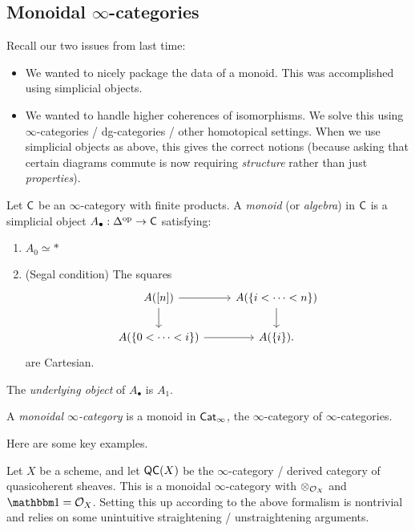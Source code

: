 \documentclass{article}
\begin{document}
\subsection{Monoidal $\infty$-categories}

Recall our two issues from last time:
\begin{itemize}
	\item We wanted to nicely package the data of a monoid.
		This was accomplished using simplicial objects.
	\item We wanted to handle higher coherences of isomorphisms.
		We solve this using $\infty$-categories / dg-categories / other homotopical settings.
		When we use simplicial objects as above, this gives the correct notions (because asking that certain diagrams commute is now requiring \emph{structure} rather than just \emph{properties}). 
\end{itemize}

\begin{dfn}
	Let $\mathsf{C}$ be an $\infty$-category with finite products.
	A \emph{monoid} (or \emph{algebra}) in $\mathsf{C}$ is a simplicial object $A_\bullet: \Delta^{\mathrm{op}} \to \mathsf{C}$ satisfying:
	\begin{enumerate}
		\item $A_0 \simeq *$
		\item (Segal condition) The squares
			\[
				\begin{tikzcd}
					A([n]) \rar \dar & A(\{i < \dots < n\}) \dar \\
					A(\{0 < \dots < i\}) \rar & A(\{i\}).
				\end{tikzcd}
			\]
			are Cartesian.
	\end{enumerate}
	The \emph{underlying object} of $A_\bullet$ is $A_1$.
\end{dfn}

\begin{dfn}
	A \emph{monoidal $\infty$-category} is a monoid in $\mathsf{Cat}_\infty$, the $\infty$-category of $\infty$-categories.
\end{dfn}

Here are some key examples.

\begin{ex}
	Let $X$ be a scheme, and let $\mathsf{QC}(X)$ be the $\infty$-category / derived category of quasicoherent sheaves.
	This is a monoidal $\infty$-category with $\otimes_{\mathcal{O}_X}$ and $\onebb = \Oc_X$.
	Setting this up according to the above formalism is nontrivial and relies on some unintuitive straightening / unstraightening arguments.
\end{ex}
\end{document}
